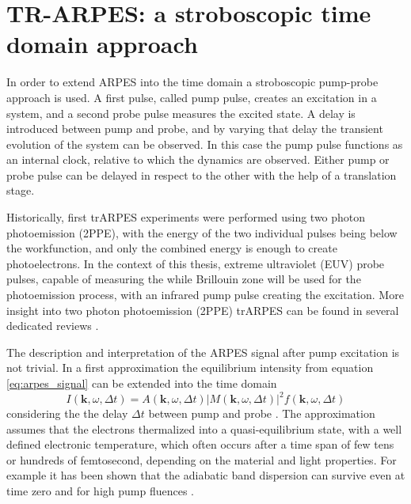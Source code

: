 \section{TR-ARPES: a stroboscopic time domain approach}

In order to extend ARPES into the time domain a stroboscopic pump-probe approach is used.
A first pulse, called pump pulse, creates an excitation in a system, and a second probe pulse measures the excited state.
A delay is introduced between pump and probe, and by varying that delay the transient evolution of the system can be observed.
In this case the pump pulse functions as an internal clock, relative to which the dynamics are observed.
Either pump or probe pulse can be delayed in respect to the other with the help of a translation stage.

Historically, first trARPES experiments were performed using two photon photoemission (2PPE), with the energy of the two individual pulses being below the workfunction, and only the combined energy is enough to create photoelectrons.
In the context of this thesis, extreme ultraviolet (EUV) probe pulses, capable of measuring the while Brillouin zone will be used for the photoemission process, with an infrared pump pulse creating the excitation.
More insight into two photon photoemission (2PPE) trARPES can be found in several dedicated reviews \cite{damascelli_multiphoton_1996,bartoli_nonlinear_1997,hofer_time-resolved_1997,bovensiepen_elementary_2012,cui_transient_2014}.

The description and interpretation of the ARPES signal after pump excitation is not trivial.
In a first approximation the equilibrium intensity from equation \ref{eq:arpes_signal} can be extended into the time domain
\begin{equation}
	I(\mathbf{k}, \omega, \Delta t) = A(\mathbf{k}, \omega, \Delta t)\left|M(\mathbf{k}, \omega, \Delta t)\right|^2f(\mathbf{k}, \omega, \Delta t)
\end{equation}
considering the the delay  $\Delta t$ between pump and probe \cite{freericks_what_2021}.
The approximation assumes that the electrons thermalized into a quasi-equilibrium state, with a well defined electronic temperature, which often occurs after a time span of few tens or hundreds of femtosecond, depending on the material and light properties.
For example it has been shown that the adiabatic band dispersion can survive even at time zero and for high pump fluences \cite{boschini_time-resolved_2024,neufeld_time-_2022}.

